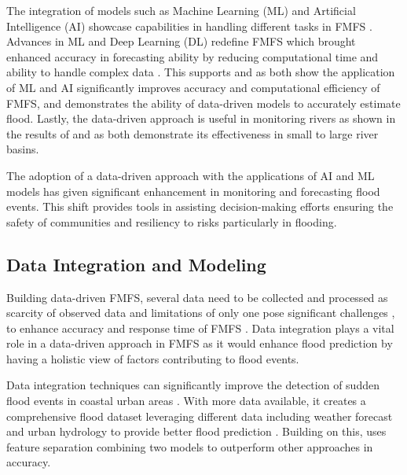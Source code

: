 \documentclass{research}
\begin{document}
The integration of models such as Machine Learning (ML) and Artificial Intelligence (AI) showcase capabilities in handling different tasks in FMFS \cite{chiang2024efficient,liu2024generative}. Advances in ML and Deep Learning (DL) redefine FMFS which brought enhanced accuracy in forecasting ability \cite{kuhaneswaran2025evolution,ni2024datadriven} by reducing computational time \cite{cache2024enhancing,mou2025ai} and ability to handle complex data \cite{ghorpade2021flood}. This supports \cite{anik2025evolution} and \cite{lou2026highly} as both show the application of ML and AI significantly improves accuracy and computational efficiency of FMFS, and \cite{chafjiri2024enhancing} demonstrates the ability of data-driven models to accurately estimate flood. Lastly, the data-driven approach is useful in monitoring rivers as shown in the results of \cite{palash2024datadriven} and \cite{okuno2021practical} as both demonstrate its effectiveness in small to large river basins.

The adoption of a data-driven approach with the applications of AI and ML models has given significant enhancement in monitoring and forecasting flood events. This shift provides tools in assisting decision-making efforts ensuring the safety of communities and resiliency to risks particularly in flooding.

\subsection*{Data Integration and Modeling}

Building data-driven FMFS, several data need to be collected and processed as scarcity of observed data and limitations of only one pose significant challenges \cite{song2024stateart,magro2025urban}, to enhance accuracy and response time of FMFS \cite{kumar2023state,shen2025new}. Data integration plays a vital role in a data-driven approach in FMFS as it would enhance flood prediction by having a holistic view of factors contributing to flood events.

Data integration techniques can significantly improve the detection of sudden flood events in coastal urban areas \cite{shampa2025integration}. With more data available, it creates a comprehensive flood dataset \cite{dong2022predictive} leveraging different data including weather forecast and urban hydrology to provide better flood prediction \cite{li2024optimizing,liu2024generative}. Building on this, \cite{thaisiam2024utilizing} uses feature separation combining two models to outperform other approaches in accuracy.
\end{document}
